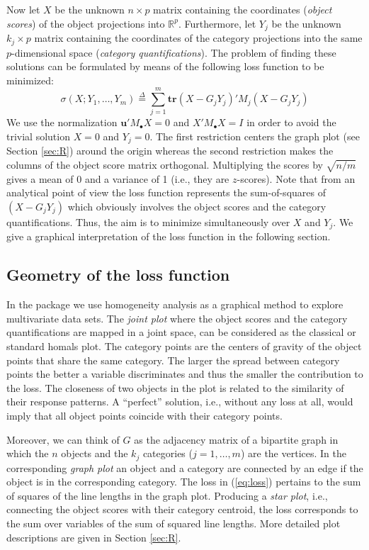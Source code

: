 \documentclass[article]{jss1}
\newcommand{\defi}{\mathop{=}\limits^{\Delta}}
\begin{document}
Now let $X$ be the unknown $n\times p$ matrix containing the coordinates (\emph{object scores}) of the object projections into $\mathbb{R}^p$. Furthermore, let $Y_j$ be the unknown $k_j \times p$ matrix containing the coordinates of the category projections into the same $p$-dimensional space (\emph{category quantifications}). 
The problem of finding these solutions can be formulated by means of the following loss function to be minimized:
\begin{equation}
\label{eq:loss}
\sigma(X;Y_1,\ldots,Y_m)\defi \sum_{j=1}^m\mathbf{tr}(X-G_jY_j)'M_j(X-G_jY_j)
\end{equation}
We use the normalization $\mathbf{u}'M_\bullet X=0$ and $X'M_\bullet X=I$ in order to avoid the trivial solution $X=0$ and $Y_j=0$. The first restriction centers the graph plot (see Section \ref{sec:R}) around the origin whereas the second restriction makes the columns of the object score matrix orthogonal. Multiplying the scores by $\sqrt{n/m}$ gives a mean of 0 and a variance of 1 (i.e., they are $z$-scores). Note that from an analytical point of view the loss function represents the sum-of-squares of $(X-G_jY_j)$ which obviously involves the object scores and the category quantifications. Thus, the aim is to minimize simultaneously over $X$ and $Y_j$. We give a graphical interpretation of the loss function in the following section. 

\subsection{Geometry of the loss function}
In the  package we use homogeneity analysis as a graphical method to explore multivariate data sets. The \emph{joint plot} where the object scores and the category quantifications are mapped in a joint space, can be considered as the classical or standard homals plot. The category points are the centers of gravity of the object points that share the same category. The larger the spread between category points the better a variable discriminates and thus the smaller the contribution to the loss. The closeness of two objects in the plot is related to the similarity of their response patterns. A ``perfect'' solution, i.e., without any loss at all, would imply that all object points coincide with their category points. 

Moreover, we can think of $G$ as the adjacency matrix of a bipartite graph in which the $n$ objects and the $k_j$ categories ($j=1,\ldots,m$) are the vertices. In the corresponding \emph{graph plot} an object and a category are connected by an edge if the object is in the corresponding category. The loss in (\ref{eq:loss}) pertains to the sum of squares of the line lengths in the graph plot. Producing a \emph{star plot}, i.e., connecting the object scores with their category centroid, the loss corresponds to the sum over variables of the sum of squared line lengths. More detailed plot descriptions are given in Section \ref{sec:R}.
\end{document}
